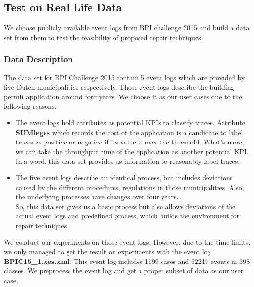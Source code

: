 \subsection{Test on Real Life Data}
We choose publicly available event logs from BPI challenge 2015 and build a data set from them to test the feasibility of proposed repair techniques.
\subsubsection{Data Description}
The data set for BPI Challenge 2015 contain 5 event logs which are provided by five Dutch municipalities respectively. Those event logs describe the building permit application around four years. We choose it as our user cases due to the following reasons.
\begin{itemize}
	\item The event logs hold attributes as potential KPIs to classify traces. Attribute \textbf{SUMleges} which records the cost of the application is a candidate to label traces as positive or negative if its value  is over the threshold. What's more, we can take the throughput time of the application as another potential KPI. \\
	In a word, this data set provides us information to reasonably label traces.
	\item The five event logs describe an identical process, but includes deviations caused by the different procedures, regulations in those municipalities. Also, the underlying processes have changes over four years.\\
	So, this data set gives us a basic process but also allows deviations of the actual event logs and predefined process, which builds the environment for repair techniques.
\end{itemize}
We conduct our experiments on those event logs. However, due to the time limits, we only managed to get the result on experiments with the event log \textbf{BPIC15\_1.xes.xml}. This event log includes 1199 cases and 52217 events in 398 classes. We preprocess the event log and get a proper subset of data as our user case.  
